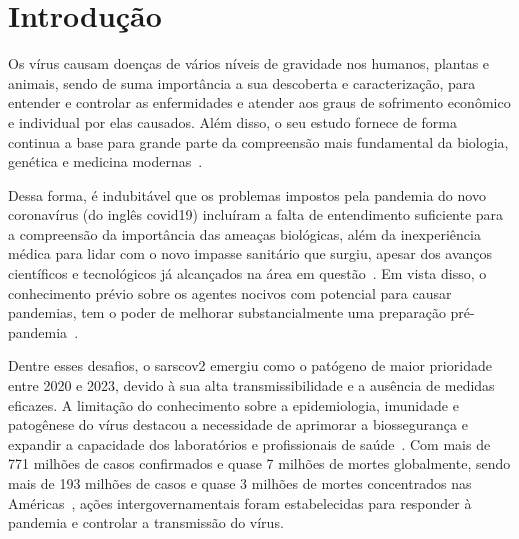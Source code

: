 
\chapter{Introdução}

\setlength{\parskip}{0.3cm}

Os vírus causam doenças de vários níveis de gravidade nos humanos, plantas e animais, sendo de suma importância a sua descoberta e caracterização, para entender e controlar as enfermidades e atender aos graus de sofrimento econômico e individual por elas causados. Além disso, o seu estudo fornece de forma continua a base para grande parte da compreensão mais fundamental da biologia, genética e medicina modernas~\cite{virology_edward_2007}.

Dessa forma, é indubitável que os problemas impostos pela pandemia do novo coronavírus (do inglês \gls{covid19}) incluíram a falta de entendimento suficiente para a compreensão da importância das ameaças biológicas, além da inexperiência médica para lidar com o novo impasse sanitário que surgiu, apesar dos avanços científicos e tecnológicos já alcançados na área em questão~\cite{coronavirus_binsfeld_2020}. Em vista disso, o conhecimento prévio sobre os agentes nocivos com potencial para causar pandemias, tem o poder de melhorar substancialmente uma preparação pré-pandemia~\cite{behl_threat_2022}.

Dentre esses desafios, o \gls{sarscov2} emergiu como o patógeno de maior prioridade entre 2020 e 2023, devido à sua alta transmissibilidade e a ausência de medidas eficazes. A limitação do conhecimento sobre a epidemiologia, imunidade e patogênese do vírus destacou a necessidade de aprimorar a biossegurança e expandir a capacidade dos laboratórios e profissionais de saúde~\cite{sarscov2_covidsurg_2021,sarscov2_deigin_2021, multiple_kuchipudi_2022, efficacy_madhi_2021}. Com mais de 771 milhões de casos confirmados e quase 7 milhões de mortes globalmente, sendo mais de 193 milhões de casos e quase 3 milhões de mortes concentrados nas Américas~\cite{who_covid19}, ações intergovernamentais foram estabelecidas para responder à pandemia e controlar a transmissão do vírus.


